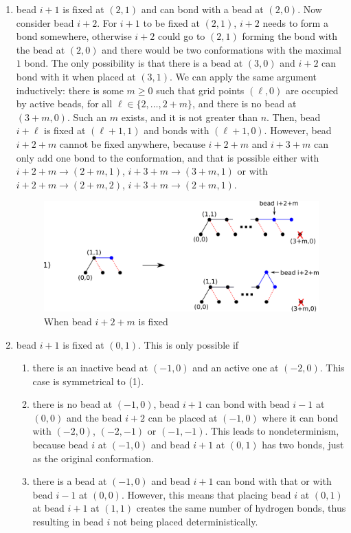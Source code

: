 \begin{enumerate}
	\item bead $i+1$ is fixed at $(2,1)$ and can bond with a bead at $(2,0)$. Now consider bead $i+2$. For $i+1$ to be fixed at $(2,1)$, $i+2$ needs to form a bond somewhere, otherwise $i+2$ could go to $(2,1)$ forming the bond with the bead at $(2,0)$ and there would be two conformations with the maximal $1$ bond. The only possibility is that there is a bead at $(3,0)$ and $i+2$ can bond with it when placed at $(3,1)$. We can apply the same argument inductively: there is some $m\geq 0$ such that grid points $(\ell,0)$ are occupied by active beads, for all $\ell\in \{2,\dots,2+m\}$, and there is no bead at $(3+m,0)$. Such an $m$ exists, and it is not greater than $n$. Then, bead $i+\ell$ is fixed at $(\ell+1,1)$ and bonds with $(\ell+1,0)$. However, bead $i+2+m$ cannot be fixed anywhere, because $i+2+m$ and $i+3+m$ can only add one bond to the conformation, and that is possible either with $i+2+m \rightarrow (2+m,1)$, $i+3+m \rightarrow (3+m,1)$ or with $i+2+m \rightarrow (2+m,2)$, $i+3+m \rightarrow (2+m,1)$. 
	\begin{figure}
		\centering
		\includegraphics[width=0.9\linewidth]{./Fig/hexagonOut2}
		\caption{When bead $i+2+m$ is fixed}
		\label{fig:hexagonout2}
	\end{figure}
	
	\item bead $i+1$ is fixed at $(0,1)$. This is only possible if
	\begin{enumerate}
		\item there is an inactive bead at $(-1,0)$ and an active one at $(-2,0)$. This case is symmetrical to (1).
		\item there is no bead at $(-1,0)$, bead $i+1$ can bond with bead $i-1$ at $(0,0)$ and the bead $i+2$ can be placed at $(-1,0)$ where it can bond with $(-2,0)$, $(-2,-1)$ or $(-1,-1)$. This leads to nondeterminism, because bead $i$ at $(-1,0)$ and bead $i+1$ at $(0,1)$ has two bonds, just as the original conformation.
		\item there is a bead at $(-1,0)$ and bead $i+1$ can bond with that or with bead $i-1$ at $(0,0)$. However, this means that placing bead $i$ at $(0,1)$ at bead $i+1$ at $(1,1)$ creates the same number of hydrogen bonds, thus resulting in bead $i$ not being placed deterministically.
		
	\end{enumerate}
\end{enumerate}




